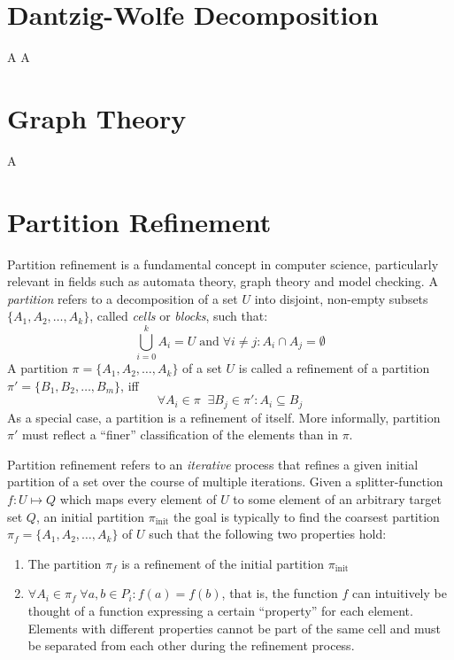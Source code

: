 	
	\section{Dantzig-Wolfe Decomposition}
	
		\clearpage
		A\clearpage
		A\clearpage
	
	\section{Graph Theory}
	
		\clearpage
		A\clearpage
	
	\section{Partition Refinement}
		Partition refinement is a fundamental concept in computer science, particularly relevant in fields such as automata theory, graph theory and model checking.
		A \textit{partition} refers to a decomposition of a set $U$ into disjoint, non-empty subsets $\{ A_1, A_2, \ldots, A_k \}$, called \textit{cells} or \textit{blocks}, such that:
		\begin{equation*}
			\bigcup^k_{i=0} A_i = U \; \mathrm{and} \; \forall i \neq j: A_i \cap A_j = \emptyset
		\end{equation*}
		A partition $\pi = \{ A_1, A_2, \ldots, A_k \}$ of a set $U$ is called a refinement of a partition $\pi' = \{ B_1, B_2, \ldots, B_m \}$, iff
		\begin{equation*}
			\forall A_i \in \pi \;\; \exists B_j \in \pi' : A_i \subseteq B_j
		\end{equation*} 
		As a special case, a partition is a refinement of itself.
		More informally, partition $\pi'$ must reflect a \enquote{finer} classification of the elements than in $\pi$. 
		
		Partition refinement refers to an \textit{iterative} process that refines a given initial partition of a set over the course of multiple iterations.
		Given a splitter-function $f: U \mapsto Q$ which maps every element of $U$ to some element of an arbitrary target set $Q$, an initial partition $\pi_{\mathrm{init}}$ the goal is typically to find the coarsest partition $\pi_f = \{ A_1, A_2, \ldots, A_k \}$ of $U$ such that the following two properties hold:
		
		\begin{enumerate}
			\item The partition $\pi_f$ is a refinement of the initial partition $\pi_{\mathrm{init}}$
			\item $\forall A_i \in \pi_f \; \forall a, b \in P_i: f(a) = f(b)$, that is, the function $f$ can intuitively be thought of a function expressing a certain \enquote{property} for each element. Elements with different properties cannot be part of the same cell and must be separated from each other during the refinement process.
		\end{enumerate}
		
